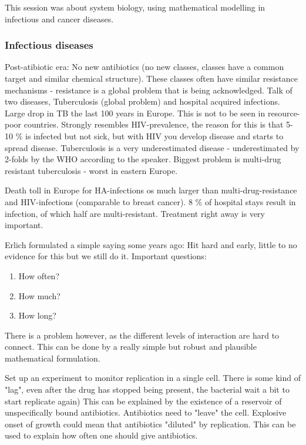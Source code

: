 \documentclass[12p]{article}
\begin{document}
This session was about system biology, using mathematical modelling in infectious and cancer diseases.

\subsubsection*{Infectious diseases}

Post-atibiotic era: No new antibiotics (no new classes, classes have a common target and similar chemical structure).
These classes often have similar resistance mechanisms - resistance is a global problem that is being acknowledged.
Talk of two diseases, Tuberculosis (global problem) and hospital acquired infections.
Large drop in TB the last 100 years in Europe.
This is not to be seen in resource-poor countries. 
Strongly resembles HIV-prevalence, the reason for this is that 5-10 \% is infected but not sick, but with HIV you develop disease and starts to spread disease.
Tuberculosis is a very underestimated disease - underestimated by 2-folds by the WHO according to the speaker.
Biggest problem is multi-drug resistant tuberculosis - worst in eastern Europe. 

Death toll in Europe for HA-infections os much larger than multi-drug-resistance and HIV-infections (comparable to breast cancer).
8 \% of hospital stays result in infection, of which half are multi-resistant.
Treatment right away is very important.

Erlich formulated a simple saying some years ago: Hit hard and early, little to no evidence for this but we still do it.
Important questions: 

\begin{enumerate}
    \item
	How often?
    \item
	How much?
    \item
	How long?
\end{enumerate}

There is a problem however, as the different levels of interaction are hard to connect.
This can be done by a really simple but robust and plausible mathematical formulation.

Set up an experiment to monitor replication in a single cell.
There is some kind of "lag", even after the drug has stopped being present, the bacterial wait a bit to start replicate again)
This can be explained by the existence of a reservoir of unspecifically bound antibiotics.
Antibiotics need to "leave" the cell.
Explosive onset of growth could mean that antibiotics "diluted" by replication.
This can be used to explain how often one should give antibiotics.
\end{document}
